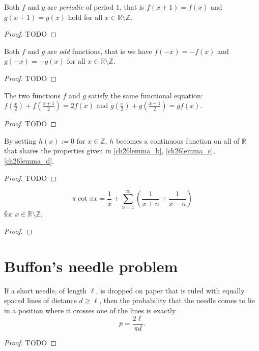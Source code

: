 \begin{lemma}[B]
  \label{ch26lemma_b}
  Both $f$ and $g$ are \emph{periodic} of period $1$, that is $f(x + 1) = f(x)$ and
  $g(x + 1) = g(x)$ hold for all $x\in \mathbb{R}\setminus\mathbb{Z}$.
\end{lemma}
\begin{proof}
  TODO
\end{proof}

\begin{lemma}[C]
  \label{ch26lemma_c}
  Both $f$ and $g$ are \emph{odd} functions, that is we have $f(-x) = -f(x)$ and
  $g(-x) = -g(x)$ for all $x\in \mathbb{R}\setminus\mathbb{Z}$.
\end{lemma}
\begin{proof}
  TODO
\end{proof}


\begin{lemma}[D]
  \label{ch26lemma_d}
  The two functions $f$ and $g$ satisfy the same functional equation:
  $f(\frac{x}{2}) + f(\frac{x + 1}{2}) = 2f(x)$ and
  $g(\frac{x}{2}) + g(\frac{x + 1}{2}) = gf(x)$.
\end{lemma}
\begin{proof}
  TODO
\end{proof}

\begin{lemma}[E]
  \label{ch26lemma_e}
  By setting $h(x) := 0$ for $x \in \mathbb{Z}$, $h$ becomes a continuous function
  on all of $\mathbb{R}$ that shares the properties given in
  \ref{ch26lemma_b}, \ref{ch26lemma_c}, \ref{ch26lemma_d}.
\end{lemma}
\begin{proof}
  TODO
\end{proof}

\begin{theorem}
  \label{ch26}
  \[
  \pi\cot{\pi x} = \frac{1}{x} + \sum_{n = 1}^\infty \left(\frac{1}{x + n} + \frac{1}{x - n}\right)
  \]
  for $x\in \mathbb{R}\setminus\mathbb{Z}$.
\end{theorem}
\begin{proof}
\end{proof}


\chapter{Buffon's needle problem}

\begin{theorem}
  \label{buffon_needle}
  If a short needle, of length $\ell$, is dropped on paper that is ruled with
  equally spaced lines of distance $d \geq \ell$, then the probability that the
  needle comes to lie in a position where it crosses one of the lines is exactly
  \[
  p = \frac{2 \ell}{\pi d}.
  \]
\end{theorem}
\begin{proof}
  TODO
\end{proof}


